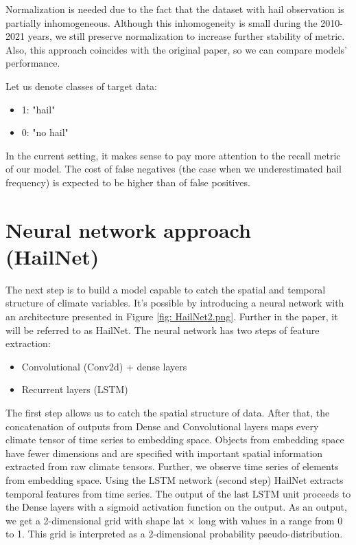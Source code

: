 \documentclass[conference]{IEEEtran}
\begin{document}
Normalization is needed due to the fact that the dataset with hail observation is partially inhomogeneous. Although this inhomogeneity is small during the 2010-2021 years, we still preserve normalization to increase further stability of metric. Also, this approach coincides with the original paper, so we can compare models' performance.

Let us denote classes of target data:
\begin{itemize}
    \item 1: "hail"
    \item 0: "no hail"
\end{itemize}

In the current setting, it makes sense to pay more attention to the recall metric of our model. The cost of false negatives (the case when we underestimated hail frequency) is expected to be higher than of false positives.


\section{Neural network approach (HailNet)}


The next step is to build a model capable to catch the spatial and temporal structure of climate variables. It's possible by introducing a neural network with an architecture presented in Figure \ref{fig: HailNet2.png}. Further in the paper, it will be referred to as HailNet.
The neural network has two steps of feature extraction:
\begin{itemize}
\item Convolutional (Conv2d) + dense layers
\item Recurrent layers (LSTM) 
\end{itemize}

The first step allows us to catch the spatial structure of data. After that, the concatenation of outputs from Dense and Convolutional layers maps every climate tensor of time series to embedding space. Objects from embedding space have fewer dimensions and are specified with important spatial information extracted from raw climate tensors. Further, we observe time series of elements from embedding space. Using the LSTM network (second step) HailNet extracts temporal features from time series. The output of the last LSTM unit proceeds to the Dense layers with a sigmoid activation function on the output. As an output, we get a 2-dimensional grid with shape lat $\times$ long with values in a range from 0 to 1. This grid is interpreted as a 2-dimensional probability pseudo-distribution. 
\end{document}
